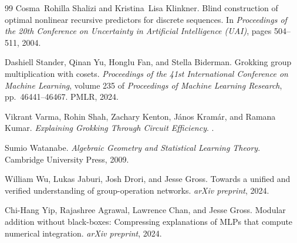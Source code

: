 \documentclass[11pt,a4paper]{article}
\begin{document}
\begin{thebibliography}{99}
Cosma~Rohilla Shalizi and Kristina~Lisa Klinkner.
\newblock Blind construction of optimal nonlinear recursive predictors for discrete sequences.
\newblock In \emph{Proceedings of the 20th Conference on Uncertainty in Artificial Intelligence (UAI)}, pages 504--511, 2004.

Dashiell Stander, Qinan Yu, Honglu Fan, and Stella Biderman.
\newblock Grokking group multiplication with cosets.
\newblock \emph{Proceedings of the 41st International Conference on Machine Learning}, volume 235 of \emph{Proceedings of Machine Learning Research}, pp.~46441--46467. PMLR, 2024.

Vikrant Varma, Rohin Shah, Zachary Kenton, János Kramár, and Ramana Kumar.
\newblock \emph{Explaining Grokking Through Circuit Efficiency}.
.

Sumio Watanabe.
\newblock \emph{Algebraic Geometry and Statistical Learning Theory}.
\newblock Cambridge University Press, 2009.

William Wu, Lukas Jaburi, Josh Drori, and Jesse Gross.
\newblock Towards a unified and verified understanding of group-operation networks.
\newblock \emph{arXiv preprint}, 2024.

Chi-Hang Yip, Rajashree Agrawal, Lawrence Chan, and Jesse Gross.
\newblock Modular addition without black-boxes: Compressing explanations of {MLP}s that compute numerical integration.
\newblock \emph{arXiv preprint}, 2024.


\end{thebibliography}
\end{document}

